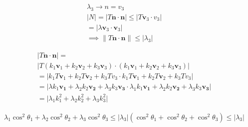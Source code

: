 \begin{problem}
    \noindent
    \normalfont

    
\begin{align}
\lambda_{3}\to n=v_{3} \\
\lvert N \rvert = \lvert T\mathbf{n}\cdot \mathbf{n} \rvert \leq \lvert T\mathbf{v}_{3}\cdot v_{3} \rvert \\
= \lvert \lambda \mathbf{v}_{3}\cdot \mathbf{v}_{3} \rvert \\
\implies \parallel T \mathbf{n} \cdot \mathbf{n}\parallel \leq \lvert \lambda_{3} \rvert 
\end{align}


\begin{align}
\lvert T \mathbf{n}\cdot \mathbf{n} \rvert =  \\
\lvert T(k_{1}\mathbf{v}_{1}+k_{2}\mathbf{v}_{2}+k_{3}\mathbf{v}_{3})\cdot(k_{1}\mathbf{v}_{1}+k_{2}\mathbf{v}_{2}+k_{3}\mathbf{v}_{3})\rvert   \\
= \lvert k_{1}T\mathbf{v}_{1}+k_{2}T\mathbf{v}_{2}+k_{3}Tv_{3} \cdot k_{1}T\mathbf{v}_{1}+k_{2}T\mathbf{v}_{2}+k_{3}Tv_{3}\rvert  \\
= \lvert \lambda k_{1}\mathbf{v_{1}} + \lambda_{2}k_{2}\mathbf{v_{2}}+\lambda_{3}k_{3}\mathbf{v_{3}} \cdot \lambda_{1}k_{1}\mathbf{v_{1}} + \lambda_{2}k_{2}\mathbf{v_{2}}+\lambda_{3}k_{3}\mathbf{v_{3}}\rvert \\
= \lvert \lambda_{1}k_{1}^2+\lambda_{2}k_{2}^2+\lambda_{3}k_{3}^2 \rvert 
\end{align}

\begin{align}
\lambda_{1}\cos^2\theta_{1}+\lambda_{2}\cos^2\theta_{2}+\lambda_{3}\cos^2\theta_{3} \leq \lvert \lambda_{3}|(\cos^2\theta_{1}+\cos^2\theta_{2}+\cos^2\theta_{3}) \leq \lvert \lambda_{3} \rvert 
\end{align}
\end{problem}
